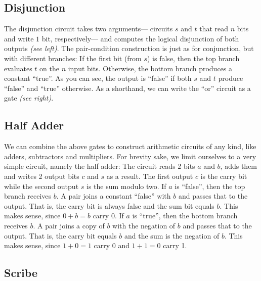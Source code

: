 \subsection{Disjunction}


%
The disjunction circuit takes two arguments---%
circuits $s$ and $t$ that read $n$ bits and write $1$ bit, respectively---%
and computes the logical disjunction of both outputs \emph{(see left)}.
The pair-condition construction is just as for conjunction,
but with different branches:
If the first bit (from $s$) is false,
then the top branch evaluates $t$ on the $n$ input bits.
Otherwise,
the bottom branch produces a constant \enquote{true}.
As you can see,
the output is \enquote{false} if both $s$ and $t$ produce \enquote{false}
and \enquote{true} otherwise.
%
As a shorthand,
we can write the \enquote{or} circuit as a gate \emph{(see right)}.

\subsection{Half Adder}


%
We can combine the above gates to construct arithmetic circuits of any kind,
like adders, subtractors and multipliers.
For brevity sake,
we limit ourselves to a very simple circuit, namely the half adder:
The circuit reads 2 bits $a$ and $b$, adds them and writes 2 output bits $c$ and $s$ as a result.
The first output $c$ is the carry bit while the second output $s$ is the sum modulo two.
%
If $a$ is \enquote{false},
then the top branch receives $b$.
A pair joins a constant \enquote{false} with $b$ and passes that to the output.
That is,
the carry bit is always false and the sum bit equals $b$.
This makes sense,
since $0 + b = b$ carry 0.
%
If $a$ is \enquote{true},
then the bottom branch receives $b$.
A pair joins a copy of $b$ with the negation of $b$ and passes that to the output.
That is,
the carry bit equals $b$ and the sum is the negation of $b$.
This makes sense,
since $1 + 0 = 1$ carry 0
and $1 + 1 = 0$ carry 1.

\subsection{Scribe}%
\label{ssec:scribe}

